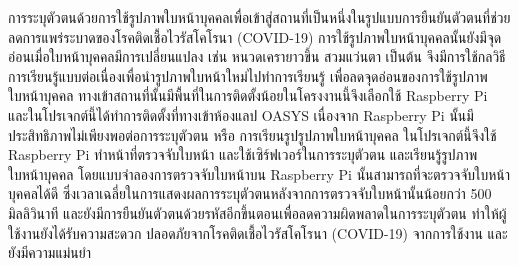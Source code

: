 \maketitle
\makesignature

\ifproject
\begin{abstractTH}


การระบุตัวตนด้วยการใช้รูปภาพใบหน้าบุคคลเพื่อเข้าสู่สถานที่เป็นหนึ่งในรูปแบบการยืนยันตัวตนที่ช่วยลดการแพร่ระบาดของโรคติดเชื้อไวรัสโคโรนา (COVID-19)
การใช้รูปภาพใบหน้าบุคคลนั้นยังมีจุดอ่อนเมื่อใบหน้าบุคคลมีการเปลี่ยนแปลง เช่น หนวดเครายาวขึ้น สวมแว่นตา เป็นต้น จึงมีการใช้กลวิธีการเรียนรู้แบบต่อเนื่องเพื่อนำรูปภาพใบหน้าใหม่ไปทำการเรียนรู้
เพื่อลดจุดอ่อนของการใช้รูปภาพใบหน้าบุคคล ทางเข้าสถานที่นั้นมีพื้นที่ในการติดตั้งน้อยในโครงงานนี้จึงเลือกใช้ Raspberry Pi และในโปรเจกต์นี้ได้ทำการติดตั้งที่ทางเข้าห้องแลป OASYS 
เนื่องจาก Raspberry Pi นั้นมีประสิทธิภาพไม่เพียงพอต่อการระบุตัวตน หรือ การเรียนรูปรูปภาพใบหน้าบุคคล ในโปรเจกต์นี้จึงใช้ Raspberry Pi ทำหน้าที่ตรวจจับใบหน้า และใช้เซิร์ฟเวอร์ในการระบุตัวตน 
และเรียนรู้รูปภาพใบหน้าบุคคล โดยแบบจำลองการตรวจจับใบหน้าบน Raspberry Pi นั้นสามารถที่จะตรวจจับใบหน้าบุคคลได้ดี ซึ่งเวลาเฉลี่ยในการแสดงผลการระบุตัวตนหลังจากการตรวจจับใบหน้านั้นน้อยกว่า 500 มิลลิวินาที 
และยังมีการยืนยันตัวตนด้วยรหัสอีกขึ้นตอนเพื่อลดความผิดพลาดในการระบุตัวตน ทำให้ผู้ใช้งานยังได้รับความสะดวก ปลอดภัยจากโรคติดเชื้อไวรัสโคโรนา (COVID-19) จากการใช้งาน และยังมีความแม่นยำ

\end{abstractTH}

